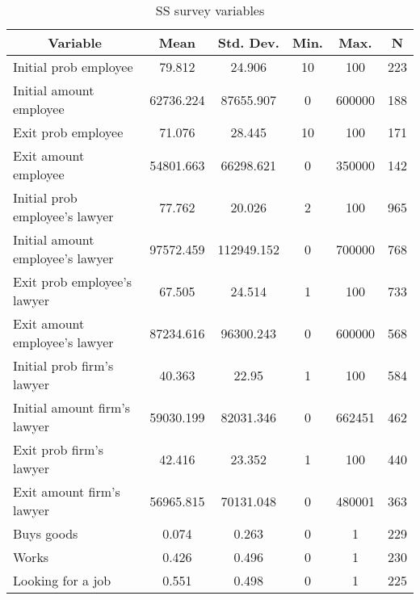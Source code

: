 
\begin{table}[htbp]\centering \caption{SS survey variables \label{sumstat}}
\begin{tabular}{l c c c c c}\hline\hline
\multicolumn{1}{c}{\textbf{Variable}} & \textbf{Mean}
 & \textbf{Std. Dev.}& \textbf{Min.} &  \textbf{Max.} & \textbf{N}\\ \hline
Initial prob employee & 79.812 & 24.906 & 10 & 100 & 223\\
Initial amount employee & 62736.224 & 87655.907 & 0 & 600000 & 188\\
Exit prob employee & 71.076 & 28.445 & 10 & 100 & 171\\
Exit amount employee & 54801.663 & 66298.621 & 0 & 350000 & 142\\
Initial prob employee's lawyer & 77.762 & 20.026 & 2 & 100 & 965\\
Initial amount employee's lawyer & 97572.459 & 112949.152 & 0 & 700000 & 768\\
Exit prob employee's lawyer & 67.505 & 24.514 & 1 & 100 & 733\\
Exit amount employee's lawyer & 87234.616 & 96300.243 & 0 & 600000 & 568\\
Initial prob firm's lawyer & 40.363 & 22.95 & 1 & 100 & 584\\
Initial amount firm's lawyer & 59030.199 & 82031.346 & 0 & 662451 & 462\\
Exit prob firm's lawyer & 42.416 & 23.352 & 1 & 100 & 440\\
Exit amount firm's lawyer & 56965.815 & 70131.048 & 0 & 480001 & 363\\
Buys goods & 0.074 & 0.263 & 0 & 1 & 229\\
Works & 0.426 & 0.496 & 0 & 1 & 230\\
Looking for a job & 0.551 & 0.498 & 0 & 1 & 225\\
\hline\end{tabular}
\end{table}
